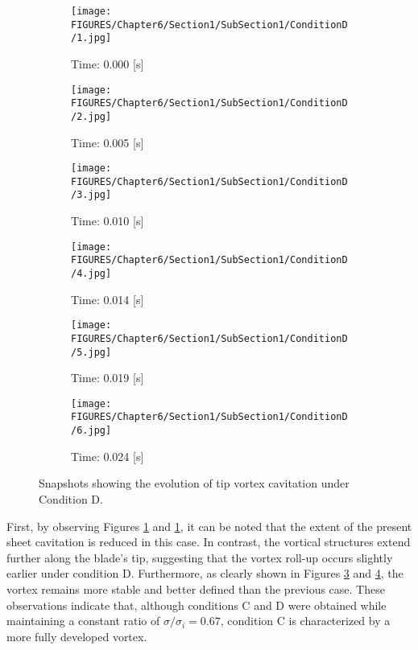 \begin{figure}[!htb]
    \centering
    \begin{subfigure}[b]{0.31\textwidth}
        \texttt{[image: FIGURES/Chapter6/Section1/SubSection1/ConditionD/1.jpg]}
        \caption{Time: 0.000 [s]}
        \label{fig:0D}
    \end{subfigure}
    \hfill
    \begin{subfigure}[b]{0.31\textwidth}
        \texttt{[image: FIGURES/Chapter6/Section1/SubSection1/ConditionD/2.jpg]}
        \caption{Time: 0.005 [s]}
        \label{fig:5D}
    \end{subfigure}
    \hfill
    \begin{subfigure}[b]{0.31\textwidth}
        \texttt{[image: FIGURES/Chapter6/Section1/SubSection1/ConditionD/3.jpg]}
        \caption{Time: 0.010 [s]}
        \label{fig:10D}
    \end{subfigure}
    \medskip
    \begin{subfigure}[b]{0.31\textwidth}
        \texttt{[image: FIGURES/Chapter6/Section1/SubSection1/ConditionD/4.jpg]}
        \caption{Time: 0.014 [s]}
        \label{fig:14D}
    \end{subfigure}
    \hfill
    \begin{subfigure}[b]{0.31\textwidth}
        \texttt{[image: FIGURES/Chapter6/Section1/SubSection1/ConditionD/5.jpg]}
        \caption{Time: 0.019 [s]}
        \label{fig:19D}
    \end{subfigure}
    \hfill
    \begin{subfigure}[b]{0.31\textwidth}
        \texttt{[image: FIGURES/Chapter6/Section1/SubSection1/ConditionD/6.jpg]}
        \caption{Time: 0.024 [s]}
        \label{fig:24D}
    \end{subfigure}
    \caption{Snapshots showing the evolution of tip vortex cavitation under Condition D.}
    \label{fig:SnapshotD}
\end{figure}

First, by observing Figures \ref{fig:0D} and \ref{fig:0D}, it can be noted that the extent of the present sheet cavitation is reduced in this case. In contrast, the vortical structures extend further along the blade's tip, suggesting that the vortex roll-up occurs slightly earlier under condition D.
Furthermore, as clearly shown in Figures \ref{fig:10D} and \ref{fig:14D}, the vortex remains more stable and better defined than the previous case.
These observations indicate that, although conditions C and D were obtained while maintaining a constant ratio of $\sigma/\sigma_i = 0.67$, condition C is characterized by a more fully developed vortex. 

